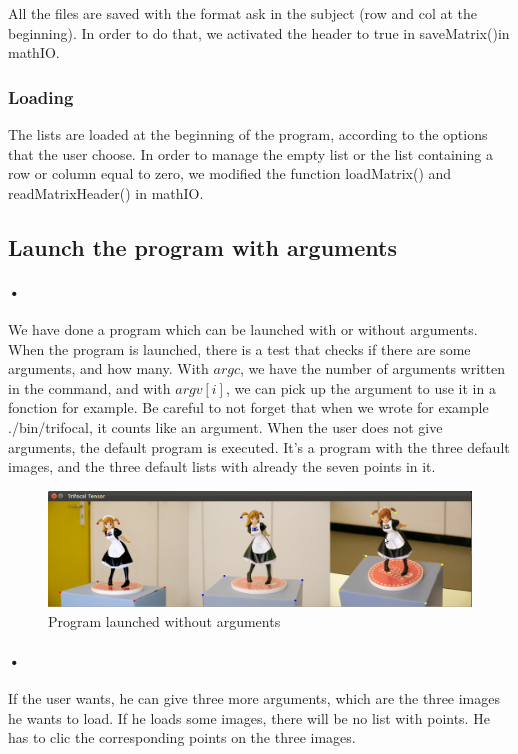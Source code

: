 \documentclass{report}
\begin{document}
All the files are saved with the format ask in the subject (row and col at the beginning). In order to do that, we activated the header to true in saveMatrix()in mathIO. 

\subsubsection{Loading}
The lists are loaded at the beginning of the program, according to the options that the user choose. In order to manage the empty list or the list containing a row or column equal to zero, we modified the function loadMatrix() and readMatrixHeader() in mathIO. 

\subsection{Launch the program with arguments}
\paragraph{•}
We have done a program which can be launched with or without arguments. When the program is launched, there is a test that checks if there are some arguments, and how many. With $argc$, we have the number of arguments written in the command, and with $argv[i]$, we can pick up the argument to use it in a fonction for example.
Be careful to not forget that when we wrote for example ./bin/trifocal, it counts like an argument.
When the user does not give arguments, the default program is executed. It's a program with the three default images, and the three default lists with already the seven points in it.

\newpage
\begin{center}
\begin{figure}
    \includegraphics[scale=0.4]{defaut.png}
    \caption{Program launched without arguments}
    \label{Picture 1}
\end{figure} 
\end{center}

\paragraph{•}
If the user wants, he can give three more arguments, which are the three images he wants to load. If he loads some images, there will be no list with points. He has to clic the corresponding points on the three images. 
\end{document}
